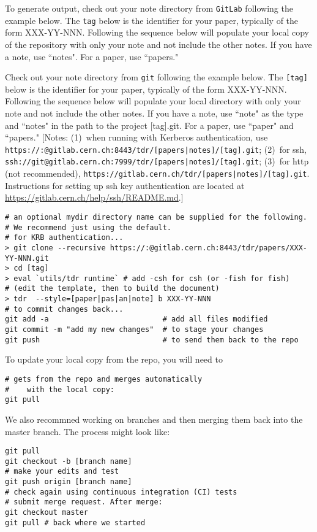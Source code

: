 To generate output, check out your note
directory from \texttt{GitLab} following the example below. The \texttt{tag} below is the identifier for your paper, typically of the form XXX-YY-NNN.
Following the sequence below will populate your local copy of the repository  with only your note and not include the other notes. If you have a note, use ``notes".
For a paper, use ``papers."

Check out your note
directory from \texttt{git} following the example below. The \texttt{[tag]} below is the identifier for your paper, typically of the form XXX-YY-NNN.
Following the sequence below will populate your local directory  with only your note and not include the other notes. If you have a note, use ``note" as the type and ``notes" in the path to the project [tag].git.
For a paper, use ``paper" and ``papers." [Notes: (1)~when running with Kerberos authentication, use \texttt{https://:@gitlab.cern.ch:8443/tdr/[papers|notes]/[tag].git}; (2)~for ssh, \texttt{ssh://git@gitlab.cern.ch:7999/tdr/[papers|notes]/[tag].git}; (3)~for http (not recommended), \texttt{https://gitlab.cern.ch/tdr/[papers|notes]/[tag].git}. Instructions for setting up ssh key authentication are located at \url{https://gitlab.cern.ch/help/ssh/README.md}.]
\begin{verbatim}
# an optional mydir directory name can be supplied for the following.
# We recommend just using the default.
# for KRB authentication...
> git clone --recursive https://:@gitlab.cern.ch:8443/tdr/papers/XXX-YY-NNN.git
> cd [tag]
> eval `utils/tdr runtime` # add -csh for csh (or -fish for fish)
# (edit the template, then to build the document)
> tdr  --style=[paper|pas|an|note] b XXX-YY-NNN
# to commit changes back...
git add -a                          # add all files modified
git commit -m "add my new changes"  # to stage your changes
git push                            # to send them back to the repo
\end{verbatim}


To update your local copy from the repo, you will need to
\begin{verbatim}
# gets from the repo and merges automatically
#    with the local copy:
git pull
\end{verbatim}
We also recommned working on branches and then merging them back into the master branch. The process might look like:
\begin{verbatim}
git pull
git checkout -b [branch name]
# make your edits and test
git push origin [branch name]
# check again using continuous integration (CI) tests
# submit merge request. After merge:
git checkout master
git pull # back where we started
\end{verbatim}
